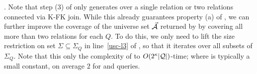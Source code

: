.
Note that step (3) of \usc only generates \bss over a single
relation or  two relations connected via K-FK join. While
this already guarantees property (a) of \usc, we can further
improve the coverage of the universe set $\vec{{\mathcal A}}$ returned by
\usc by covering all  more than two relations for each
$Q$. To do this, we only need to lift the size restriction on set
$\Sigma\subseteq \Sigma_{Q}$ in line~\ref{usc-l3} of \usc, so
that it iterates over all subsets of $\Sigma_{Q}$. Note that
this only   
the complexity of \usc to
$O(2^{\kappa}|{\mathcal Q}|)$-time; where \revise{$\kappa$} %
is typically a
small constant, \eg on average $2$ %
for \tpch and \tpcds queries.

